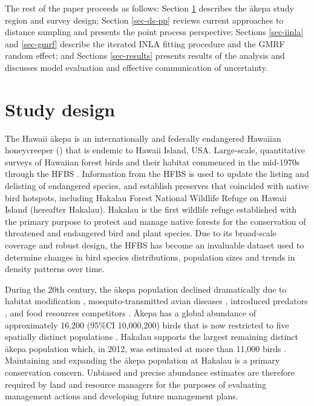 \documentclass{statsoc}
\newcommand{\akepa}{\textquotesingle\={a}kepa}  %
\newcommand{\Akepa}{\textquotesingle\={A}kepa}  %
\newcommand{\hawaii}{Hawai\textquotesingle i}   %
\begin{document}
The rest of the paper proceeds as follows:  Section \ref{sec-study-design} describes the \akepa{} study region and survey design; Section \ref{sec-ds-pp} reviews current approaches to distance sampling and presents the point process perspective; Sections \ref{sec-iinla} and \ref{sec-gmrf} describe the iterated INLA fitting procedure and the GMRF random effect; and Sections \ref{sec-results} presents results of the analysis and discusses model evaluation and effective communication of uncertainty.


\section{Study design}
\label{sec-study-design}

The \hawaii{} \akepa{} is an internationally and federally endangered Hawaiian honeycreeper (\citealp{usfws_akepa_1970, birdlife_akepa_2016}) that is endemic to \hawaii{} Island, USA.  Large-scale, quantitative surveys of Hawaiian forest birds and their habitat commenced in the mid-1970s through the HFBS \citep{scott_HFBS_1986}. Information from the HFBS is used to update the listing and delisting of endangered species, and establish preserves that coincided with native bird hotspots, including Hakalau Forest National Wildlife Refuge on \hawaii{} Island (hereafter Hakalau).  Hakalau is the first wildlife refuge established with the primary purpose to protect and manage native forests for the conservation of threatened and endangered bird and plant species. Due to its broad-scale coverage and robust design, the HFBS has become an invaluable dataset used to determine changes in bird species distributions, population sizes and trends in density patterns over time.

During the 20th century, the \akepa{} population declined dramatically due to habitat modification \citep{scott_HFBS_1986, pratt_avifaunal_1994},  mosquito-transmitted avian diseases \citep{pratt_avifaunal_1994, atkinson_wildlife_1995}, introduced predators \citep{lepson_akepa_1997}, and food resources competitors \citep{lepson_akepa_1997}. \Akepa{} has a global abundance of approximately 16,200 (95\%CI 10,000,200) birds that is now restricted to five spatially distinct populations \citep{judge_akepa_2018}. Hakalau supports the largest remaining distinct \akepa{} population which, in 2012, was estimated at more than 11,000 birds \citep{camp_statespace_2016}. Maintaining and expanding the \akepa{} population at Hakalau is a primary conservation concern. Unbiased and precise abundance estimates are therefore required by land and resource managers for the purposes of evaluating management actions and developing future management plans.
\end{document}
